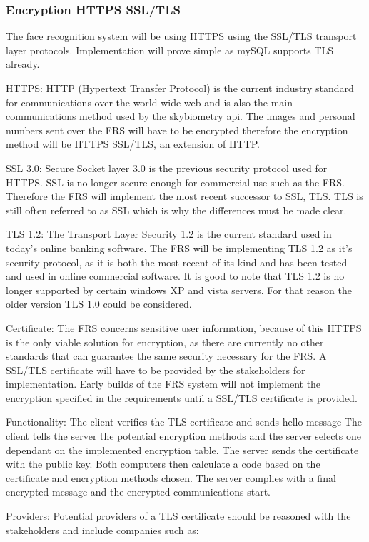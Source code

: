 \documentclass[a4paper,11pt]{article}
\begin{document}
\subsubsection{Encryption HTTPS SSL/TLS}
The face recognition system will be using HTTPS using the SSL/TLS transport layer protocols. Implementation will prove simple as mySQL supports TLS already. 

HTTPS: HTTP (Hypertext Transfer Protocol) is the current industry standard for communications over the world wide web and is also the main communications method used by the skybiometry api. The images and personal numbers sent over the FRS will have to be encrypted therefore the encryption method will be HTTPS SSL/TLS, an extension of HTTP.

SSL 3.0: Secure Socket layer 3.0 is the previous security protocol used for HTTPS. SSL is no longer secure enough for commercial use such as the FRS. Therefore the FRS will implement the most recent successor to SSL, TLS. TLS is still often referred to as SSL which is why the differences must be made clear.

TLS 1.2: The Transport Layer Security 1.2 is the current standard used in today's online banking software. The FRS will be implementing TLS 1.2 as it’s security protocol, as it is both the most recent of its kind and has been tested and used in online commercial software. It is good to note that TLS 1.2 is no longer supported by certain windows XP and vista servers. For that reason the older version TLS 1.0 could be considered.

Certificate:
The FRS concerns sensitive user information, because of this HTTPS is the only viable solution for encryption, as there are currently no other standards that can guarantee the same security necessary for the FRS. A SSL/TLS certificate will have to be provided by the stakeholders for implementation. Early builds of the FRS system will not implement the encryption specified in the requirements until a SSL/TLS certificate is provided. 

Functionality:
The client verifies the TLS certificate and sends hello message
The client tells the server the potential encryption methods and the server selects one dependant on the implemented encryption table.
The server sends the certificate with the public key.
Both computers then calculate a code based on the certificate and encryption methods chosen.
The server complies with a final encrypted message and the encrypted communications start.

Providers:
Potential providers of a TLS certificate should be reasoned with the stakeholders and include companies such as:
\end{document}
